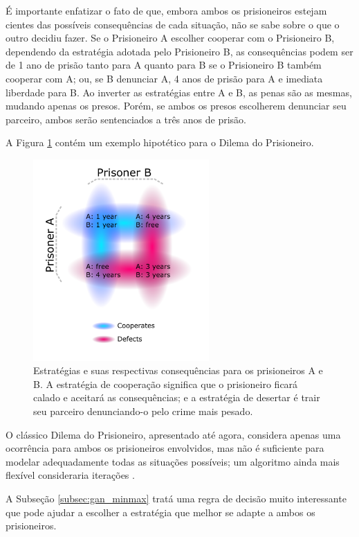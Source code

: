É importante enfatizar o fato de que, embora ambos os prisioneiros estejam cientes das possíveis consequências de cada situação, não se sabe sobre o que o outro decidiu fazer. Se o Prisioneiro A escolher cooperar com o Prisioneiro B, dependendo da estratégia adotada pelo Prisioneiro B, as consequências podem ser de 1 ano de prisão tanto para A quanto para B se o Prisioneiro B também cooperar com A; ou, se B denunciar A, 4 anos de prisão para A e imediata liberdade para B. Ao inverter as estratégias entre A e B, as penas são as mesmas, mudando apenas os presos. Porém, se ambos os presos escolherem denunciar seu parceiro, ambos serão sentenciados a três anos de prisão.

A Figura \ref{fig:prisoners_dilemma} contém um exemplo hipotético para o Dilema do Prisioneiro.

\begin{figure}[H]
    \centering
    \includegraphics[width=0.60\textwidth]{figs/gan_prisoners_dilemma.pdf}
    \caption{Estratégias e suas respectivas consequências para os prisioneiros A e B. A estratégia de cooperação significa que o prisioneiro ficará calado e aceitará as consequências; e a estratégia de desertar é trair seu parceiro denunciando-o pelo crime mais pesado.}
    \label{fig:prisoners_dilemma}
\end{figure}

O clássico Dilema do Prisioneiro, apresentado até agora, considera apenas uma ocorrência para ambos os prisioneiros envolvidos, mas não é suficiente para modelar adequadamente todas as situações possíveis; um algoritmo ainda mais flexível consideraria iterações \citep{press2012iterated}.

A Subseção \ref{subsec:gan_minmax} tratá uma regra de decisão muito interessante que pode ajudar a escolher a estratégia que melhor se adapte a ambos os prisioneiros.




